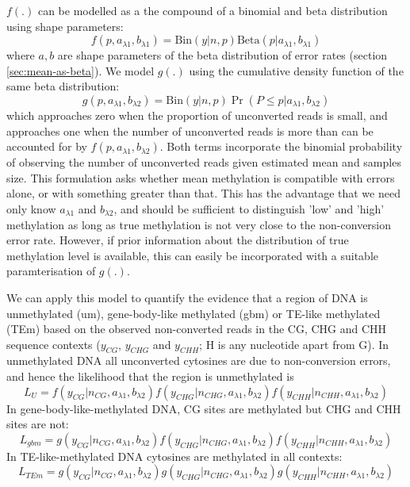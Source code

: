\documentclass[twocolumn,twoside,lettersize]{article}
\begin{document}
$f(.)$ can be modelled as a the compound of a binomial and beta distribution using shape parameters:
\begin{equation}
    f(p,a_{\lambda1}, b_{\lambda1}) = 
    \textrm{Bin}(y|n,p)
    \textrm{Beta}(p | a_{\lambda1}, b_{\lambda1})
\end{equation}
where $a, b$ are shape parameters of the beta distribution of error rates (section \ref{sec:mean-as-beta}).
We model $g(.)$ using the cumulative density function of the same beta distribution:
\begin{equation}
    g(p,a_{\lambda1}, b_{\lambda2}) = 
    \textrm{Bin}(y|n,p)
    \Pr( P \leq p | a_{\lambda1}, b_{\lambda2})
\end{equation}
which approaches zero when the proportion of unconverted reads is small, and approaches one when the number of unconverted reads is more than can be accounted for by $ f(p,a_{\lambda1}, b_{\lambda2}) $.
Both terms incorporate the binomial probability of observing the number of unconverted reads given estimated mean and samples size.
This formulation asks whether mean methylation is compatible with errors alone, or with something greater than that.
This has the advantage that we need only know $a_{\lambda1}$ and $b_{\lambda2}$, and should be sufficient to distinguish 'low' and 'high' methylation as long as true methylation is not very close to the non-conversion error rate.
However, if prior information about the distribution of true methylation level is available, this can easily be incorporated with a suitable paramterisation of $g(.)$.

We can apply this model to quantify the evidence that a region of DNA is unmethylated (um), gene-body-like methylated (gbm) or TE-like methylated (TEm) based on the observed non-converted reads in the CG, CHG and CHH sequence contexts ($y_{CG}$, $y_{CHG}$ and $y_{CHH}$; H is any nucleotide apart from G).
In unmethylated DNA all unconverted cytosines are due to non-conversion errors, and hence the likelihood that the region is unmethylated is
\begin{equation}
    L_U =
    f(y_{CG}  | n_{CG},  a_{\lambda1}, b_{\lambda2})
    f(y_{CHG} | n_{CHG}, a_{\lambda1}, b_{\lambda2})
    f(y_{CHH} | n_{CHH}, a_{\lambda1}, b_{\lambda2})
\end{equation}
In gene-body-like-methylated DNA, CG sites are methylated but CHG and CHH sites are not: 
\begin{equation}
    L_{gbm} =
    g(y_{CG}  | n_{CG},  a_{\lambda1}, b_{\lambda2})
    f(y_{CHG} | n_{CHG}, a_{\lambda1}, b_{\lambda2})
    f(y_{CHH} | n_{CHH}, a_{\lambda1}, b_{\lambda2})
\end{equation}
In TE-like-methylated DNA cytosines are methylated in all contexts:
\begin{equation}
    L_{TEm} =
    g(y_{CG}  | n_{CG},  a_{\lambda1}, b_{\lambda2})
    g(y_{CHG} | n_{CHG}, a_{\lambda1}, b_{\lambda2})
    g(y_{CHH} | n_{CHH}, a_{\lambda1}, b_{\lambda2})
\end{equation}
\end{document}
